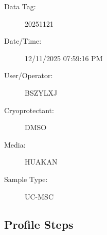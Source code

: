 \documentclass[UTF8,10pt,a4paper,fontset=fandol]{ctexart}
\newcommand{\fieldvalue}[1]{#1}
\begin{document}
\begin{description}
\item[Data Tag:]%
\fieldvalue{20251121}

\item[Date/Time:]%
\fieldvalue{12/11/2025 07:59:16 PM}

\item[User/Operator:]%
\fieldvalue{BSZYLXJ}

\item[Cryoprotectant:]%
\fieldvalue{DMSO}

\item[Media:]%
\fieldvalue{HUAKAN}

\item[Sample Type:]%
\fieldvalue{UC-MSC}
\end{description}

\subsection*{Profile Steps}
\end{document}
